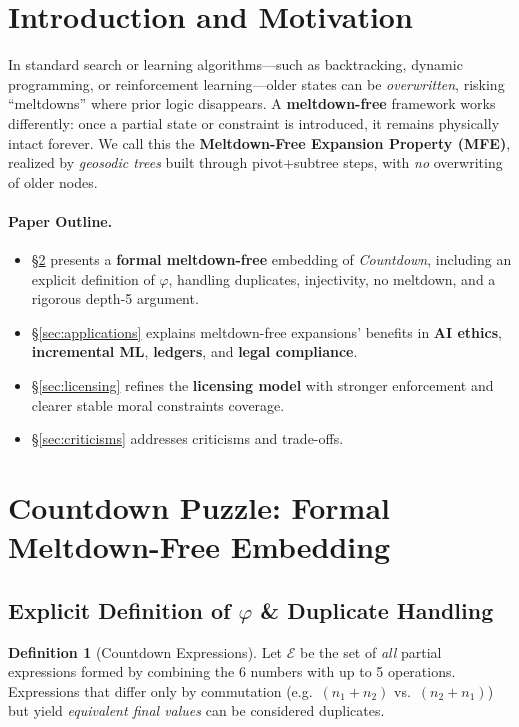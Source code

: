 \documentclass[acmsmall]{acmart}
\theoremstyle{definition}
\newtheorem{definition}[theorem]{Definition}
\theoremstyle{remark}
\begin{document}
\section{Introduction and Motivation}
In standard search or learning algorithms—such as backtracking, dynamic programming,
or reinforcement learning—older states can be \emph{overwritten}, risking
“meltdowns” where prior logic disappears. A \textbf{meltdown-free} framework
works differently: once a partial state or constraint is introduced, it remains
physically intact forever. We call this the \textbf{Meltdown-Free Expansion
Property (MFE)}, realized by \emph{geosodic trees} built through pivot+subtree
steps, with \emph{no} overwriting of older nodes.

\paragraph{Paper Outline.}
\begin{itemize}[leftmargin=*]
\item \S\ref{sec:countdown-proof} presents a \textbf{formal meltdown-free}
      embedding of \emph{Countdown}, including an explicit definition of $\varphi$,
      handling duplicates, injectivity, no meltdown, and a rigorous depth-5 argument.
\item \S\ref{sec:applications} explains meltdown-free expansions’ benefits in
      \textbf{AI ethics}, \textbf{incremental ML}, \textbf{ledgers}, and
      \textbf{legal compliance}.
\item \S\ref{sec:licensing} refines the \textbf{licensing model} with stronger
      enforcement and clearer stable moral constraints coverage.
\item \S\ref{sec:criticisms} addresses criticisms and trade-offs.
\end{itemize}

\section{Countdown Puzzle: Formal Meltdown-Free Embedding}
\label{sec:countdown-proof}

\subsection{Explicit Definition of $\varphi$ \& Duplicate Handling}
\begin{definition}[Countdown Expressions]
\label{def:countdown-expr}
Let $\mathcal{E}$ be the set of \emph{all} partial expressions formed by combining
the 6 numbers with up to 5 operations. Expressions that differ only by commutation
(e.g.\ $(n_1 + n_2)$ vs.\ $(n_2 + n_1)$) but yield \emph{equivalent final values}
can be considered duplicates.
\end{definition}
\end{document}
